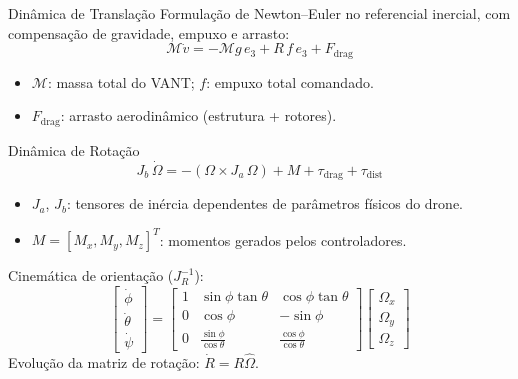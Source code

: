 \documentclass[aspectratio=169, 11pt]{beamer}
\begin{document}
\begin{frame}{Dinâmica de Translação}
  Formulação de Newton--Euler no referencial inercial, com compensação de
  gravidade, empuxo e arrasto:
  \begin{equation}
    \mathcal{M}\dot{v} = -\mathcal{M}g\,e_3 + R\,f\,e_3 + F_{\text{drag}}
  \end{equation}
  \begin{itemize}
    \item $\mathcal{M}$: massa total do VANT; \quad $f$: empuxo total comandado.
    \item $F_{\text{drag}}$: arrasto aerodinâmico (estrutura + rotores).
  \end{itemize}
\end{frame}

\begin{frame}{Dinâmica de Rotação}
  \begin{equation}
    J_b\,\dot{\Omega} = -(\Omega \times J_a\,\Omega) + M + \tau_{\text{drag}} + \tau_{\text{dist}}
  \end{equation}
  \begin{itemize}
    \item $J_a$, $J_b$: tensores de inércia dependentes de parâmetros físicos do drone.
    \item $M = [M_x, M_y, M_z]^T$: momentos gerados pelos controladores.
  \end{itemize}
  Cinemática de orientação ($J_R^{-1}$):
  \begin{equation}
    \begin{bmatrix} \dot{\phi} \\ \dot{\theta} \\ \dot{\psi} \end{bmatrix} =
    \begin{bmatrix}
      1 & \sin\phi\tan\theta & \cos\phi\tan\theta \\
      0 & \cos\phi           & -\sin\phi \\
      0 & \frac{\sin\phi}{\cos\theta} & \frac{\cos\phi}{\cos\theta}
    \end{bmatrix}
    \begin{bmatrix} \Omega_x \\ \Omega_y \\ \Omega_z \end{bmatrix}
  \end{equation}
  Evolução da matriz de rotação: $\dot{R} = R\hat{\Omega}$.
\end{frame}
\end{document}
